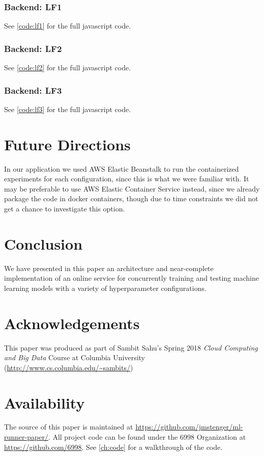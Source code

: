 \documentclass[12pt,oneside]{amsart}
\begin{document}
\subsubsection{Backend: LF1}
See \ref{code:lf1} for the full javascript code.

\subsubsection{Backend: LF2}
See \ref{code:lf2} for the full javascript code.

\subsubsection{Backend: LF3}
See \ref{code:lf3} for the full javascript code.

\begin{multicols}{2}
\section{Future Directions} \label{ch:future}
In our application we used AWS Elastic Beanstalk to run the containerized experiments for each configuration, since this is what we were familiar with.
It may be preferable to use AWS Elastic Container Service instead, since we already package the code in docker containers, though due to time constraints we did not get a chance to investigate this option.

\section{Conclusion} \label{ch:conclusion}
We have presented in this paper an architecture and near-complete implementation of an online service for concurrently training and testing machine learning models with a variety of hyperparameter configurations.

\section{Acknowledgements}
This paper was produced as part of Sambit Sahu's Spring 2018
\textit{Cloud Computing and Big Data} Course at Columbia University (\url{http://www.cs.columbia.edu/~sambits/})

\section{Availability}
The source of this paper is maintained at \url{https://github.com/jmstenger/ml-runner-paper/}.
All project code can be found under the 6998 Organization at \url{https://github.com/6998}.
See \ref{ch:code} for a walkthrough of the code.

\end{multicols}


\end{document}
